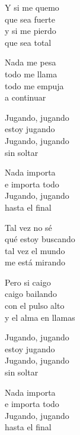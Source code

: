\begin{lyrics}
Y si me quemo\\
que sea fuerte\\
y si me pierdo\\
que sea total

Nada me pesa\\
todo me llama\\
todo me empuja\\
a continuar

Jugando, jugando\\
estoy jugando\\
Jugando, jugando\\
sin soltar

Nada importa\\
e importa todo\\
Jugando, jugando\\
hasta el final

Tal vez no sé\\
qué estoy buscando\\
tal vez el mundo\\
me está mirando

Pero si caigo\\
caigo bailando\\
con el pulso alto\\
y el alma en llamas

Jugando, jugando\\
estoy jugando\\
Jugando, jugando\\
sin soltar

Nada importa\\
e importa todo\\
Jugando, jugando\\
hasta el final
\end{lyrics}

